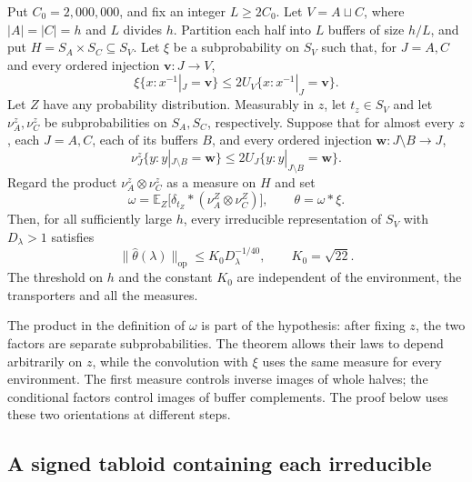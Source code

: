 \begin{theorem}
\label{l:tabloid-product}
Put $C_0=2{,}000{,}000$, and fix an integer $L\ge 2C_0$.
Let $V=A\sqcup C$, where $|A|=|C|=h$ and $L$ divides $h$.
Partition each half into $L$ buffers of size $h/L$, and put
$H=S_A\times S_C\subseteq S_V$.
Let $\xi$ be a subprobability on $S_V$ such that, for $J=A,C$ and
every ordered injection $\mathbf v:J\longrightarrow V$,
\begin{equation}
 \xi\{x:x^{-1}|_J=\mathbf v\}
 \le 2U_V\{x:x^{-1}|_J=\mathbf v\}.
 \label{l:tabloid-inverse-caps}
\end{equation}
Let $Z$ have any probability distribution.  Measurably in $z$, let
$t_z\in S_V$ and let $\nu_A^z,\nu_C^z$ be subprobabilities on
$S_A,S_C$, respectively.  Suppose that for almost every $z$, each
$J=A,C$, each of its
buffers $B$, and every ordered injection
$\mathbf w:J\setminus B\longrightarrow J$,
\begin{equation}
 \nu_J^z\{y:y|_{J\setminus B}=\mathbf w\}
 \le 2U_J\{y:y|_{J\setminus B}=\mathbf w\}.
 \label{l:tabloid-factor-caps}
\end{equation}
Regard the product $\nu_A^z\otimes\nu_C^z$ as a measure on $H$ and set
\[
 \omega=\mathbb E_Z\bigl[\delta_{t_Z}*
                (\nu_A^Z\otimes\nu_C^Z)\bigr],
 \qquad \theta=\omega*\xi.
\]
Then, for all sufficiently large $h$, every irreducible representation
of $S_V$ with $D_\lambda>1$ satisfies
\begin{equation}
 \|\widehat\theta(\lambda)\|_{\mathrm{op}}
 \le K_0D_\lambda^{-1/40},\qquad K_0=\sqrt{22}.
 \label{l:tabloid-product-bound}
\end{equation}
The threshold on $h$ and the constant $K_0$ are independent of the
environment, the transporters and all the measures.
\end{theorem}

The product in the definition of $\omega$ is part of the hypothesis:
after fixing $z$, the two factors are separate subprobabilities.
The theorem allows their laws to depend arbitrarily on $z$, while the
convolution with $\xi$ uses the same measure for every environment.
The first
measure controls inverse images of whole halves; the conditional
factors control images of buffer complements.  The proof below uses
these two orientations at different steps.

\subsection{A signed tabloid containing each irreducible}

